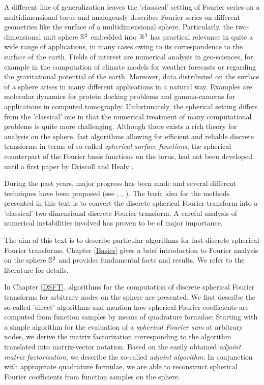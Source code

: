 A different line of generalization leaves the 'classical' setting of  Fourier
series on a multidimensional torus and analogously describes Fourier series on
different geometries like the surface of a multidimensional sphere.
Particularly, the two-dimensional unit sphere $\mathbb{S}^2$ embedded 
into $\mathbb{R}^3$ has practical
relevance in quite a wide range of  applications, in many cases owing to its
correspondence to the surface of the earth. Fields of interest are numerical
analysis in geo-sciences, for example in the computation of climate models for
weather forecasts or regarding the gravitational potential of the  earth.
Moreover, data distributed on the surface of a sphere arises in many different
applications in a natural way. Examples are molecular dynamics for protein
docking problems and  gamma-cameras for applications in computed tomography.
Unfortunately, the spherical setting differs from the 'classical'  one in that
the numerical treatment of many computational problems is quite more
challenging. Although there exists a rich theory for  analysis on the sphere,
fast algorithms allowing for efficient and reliable discrete transforms in
terms of so-called  \emph{spherical surface functions}, the spherical
counterpart of the  Fourier basis functions on the torus, had not been
developed until a first paper by Driscoll and Healy  \cite{drhe}.

During the past years, major progress has been made and several  different
techniques have been proposed (see \cite{HeRoKoMo},  \cite{suta}, \cite{roty}).
The basic idea for the  methods presented in this text is to convert the
discrete spherical  Fourier transform into a 'classical' two-dimensional
discrete  Fourier transform. A careful analysis of numerical instabilities
involved has proven to be of major  importance.

The aim of this text is to describe particular algorithms for fast discrete
spherical Fourier transforms. Chapter \ref{Basics} gives a brief  introduction
to Fourier analysis on the sphere $\mathbb{S}^2$ and  provides fundamental facts
and results. We refer to the literature for  details.

In Chapter \ref{DSFT}, algorithms for the computation of discrete spherical
Fourier transforms for arbitrary nodes on the sphere  are presented. We first
describe the so-called 'direct' algorithms  and mention how spherical Fourier
coefficients are computed from function samples by means of quadrature formulae: Starting with a
simple algorithm  for the evaluation of a \emph{spherical Fourier sum} at
arbitrary  nodes, we derive the matrix factorization corresponding to the 
algorithm translated into matrix-vector notation. Based on the  easily obtained
\emph{adjoint matrix factorization}, we  describe the so-called \emph{adjoint
algorithm}. In conjunction with appropriate quadrature formulae, we are able to
reconstruct spherical Fourier coefficients from function samples on the sphere.

